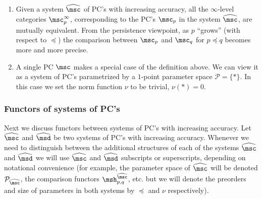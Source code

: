 \begin{rem} \label{rem:pc-limits}
  \begin{enumerate}
  \item Given a system $\widehat{\msc}$ of PC's with increasing accuracy,
    all the $\infty$-level categories $\msc^{\infty}_p$, corresponding
    to the PC's $\msc_p$ in the system $\widehat{\msc}$, are mutually
    equivalent. From the persistence viewpoint, as $p$ ``grows'' (with
    respect to $\preceq$) the comparison between $\msc_p$ and
    $\msc_q$ for $p \preceq q$ becomes more and more
    precise. \label{i:rem-PC-1}
  \item A single PC $\msc$ makes a special case of the definition
    above. We can view it as a system of PC's parametrized by a
    $1$-point parameter space $\mathcal{P} = \{*\}$. In this case we
    set the norm function $\nu$ to be trivial, $\nu(*) =0$.
  \end{enumerate}
\end{rem}



\subsubsection{Functors of systems of PC's} \label{sbsb:func-sys-pc}
Next we discuss functors between systems of PC's with increasing
accuracy. Let $\widehat{\msc}$ and $\widehat{\msd}$ be two systems of
PC's with increasing accuracy. Whenever we need to distinguish between
the additional structures of each of the systems $\widehat{\msc}$ and
$\widehat{\msd}$ we will use $\widehat{\msc}$ and $\widehat{\msd}$
subscripts or superscripts, depending on notational convenience (for
example, the parameter space of $\widehat{\msc}$ will be denoted
$\mathcal{P}_{\widehat{\msc}}$, the comparison functors
$\msh_{p,q}^{\widehat{\msc}}$, etc. but we will denote the preorders
and size of parameters in both systems by $\preceq$ and $\nu$
respectively).


